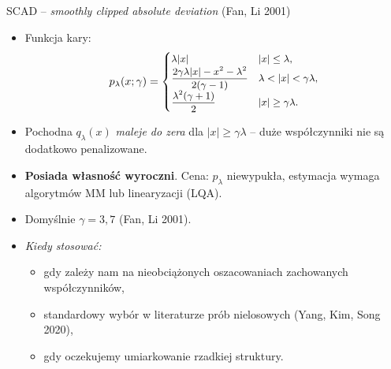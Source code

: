 \documentclass[10pt,ignorenonframetext, aspectratio=169]{beamer}
\begin{document}
\begin{frame}{SCAD -- \emph{smoothly clipped absolute deviation} (Fan, Li 2001)}
\begin{itemize}
\justifying
    \item Funkcja kary:
    \begin{equation*}
    \small
        p_{\lambda}(x; \gamma) = \begin{cases} \lambda|x| & |x| \leq \lambda, \\ \dfrac{2\gamma\lambda|x| - x^2 - \lambda^2}{2(\gamma-1)} & \lambda < |x| < \gamma\lambda, \\ \dfrac{\lambda^2(\gamma+1)}{2} & |x| \geq \gamma\lambda. \end{cases}
    \end{equation*}
    \item Pochodna $q_\lambda(x)$ \emph{maleje do zera} dla $|x| \geq \gamma\lambda$ -- duże współczynniki nie są dodatkowo penalizowane.
    \item \textbf{Posiada własność wyroczni}. Cena: $p_\lambda$ niewypukła, estymacja wymaga algorytmów MM lub linearyzacji (LQA).
    \item Domyślnie $\gamma=3{,}7$ (Fan, Li 2001).
    \item \emph{Kiedy stosować:}
    \begin{itemize}
        \item gdy zależy nam na nieobciążonych oszacowaniach zachowanych współczynników,
        \item standardowy wybór w literaturze prób nielosowych (Yang, Kim, Song 2020),
        \item gdy oczekujemy umiarkowanie rzadkiej struktury.
    \end{itemize}
\end{itemize}
\end{frame}
\end{document}
